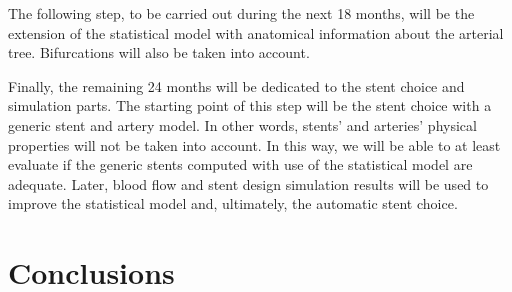 \documentclass[a4paper]{article}
\begin{document}
The following step, to be carried out during the next 18 months, will be the extension of the statistical model with anatomical information about the arterial tree. Bifurcations will also be taken into account. 

Finally, the remaining 24 months will be dedicated to the stent choice and simulation parts. The starting point of this step will be the stent choice with a generic stent and artery model. In other words, stents' and arteries' physical properties will not be taken into account. In this way, we will be able to at least evaluate if the generic stents computed with use of the statistical model are adequate. Later, blood flow and stent design simulation results will be used to improve the statistical model and, ultimately, the automatic stent choice.  

\section{Conclusions}



\end{document}

